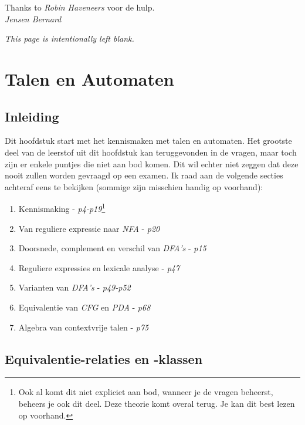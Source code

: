 \documentclass[10pt,a4paper]{article}
\begin{document}
Thanks to \emph{Robin Haveneers} voor de hulp.
\\

\hfill \emph{Jensen Bernard}
\newpage
\tableofcontents
\newpage
\begin{center}
	\emph{This page is intentionally left blank.}
\end{center}

\newpage
\clearpage
{}

\section{Talen en Automaten}

\subsection{Inleiding}

	Dit hoofdstuk start met het kennismaken met talen en automaten. Het grootste deel van de leerstof uit dit hoofdstuk kan teruggevonden in de vragen, maar toch zijn er enkele puntjes die niet aan bod komen. Dit wil echter niet zeggen dat deze nooit zullen worden gevraagd op een examen. Ik raad aan de volgende secties achteraf eens te bekijken (sommige zijn misschien handig op voorhand):
	\begin{enumerate}
		\item Kennismaking - \emph{p4-p19}\footnote{Ook al komt dit niet expliciet aan bod, wanneer je de vragen beheerst, beheers je ook dit deel. Deze theorie komt overal terug. Je kan dit best lezen op voorhand.}
		\item Van reguliere expressie naar \emph{NFA} - \emph{p20}
		\item Doorsnede, complement en verschil van \emph{DFA's} - \emph{p15}
		\item Reguliere expressies en lexicale analyse - \emph{p47}
		\item Varianten van \emph{DFA's} - \emph{p49-p52}
		\item Equivalentie van \emph{CFG} en \emph{PDA} - \emph{p68}
		\item Algebra van contextvrije talen - \emph{p75}
	\end{enumerate}

\subsection{Equivalentie-relaties en -klassen}
\end{document}
